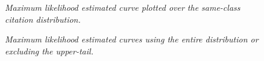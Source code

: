 \documentclass[letterpaper,12pt]{article}
\theoremstyle{definition}
\begin{document}
\begin{figure}[htb]\centering \captionsetup{width=5.8in}
    \caption{\label{fig:MLE}\textit{Maximum likelihood estimated curve plotted over the same-class citation distribution.}}
\end{figure}

\begin{figure}[htb]\centering \captionsetup{width=5.8in}
    \caption{\label{fig:MLE_extail}\textit{Maximum likelihood estimated curves using the entire distribution or excluding the upper-tail.}}
\end{figure}
\end{document}
